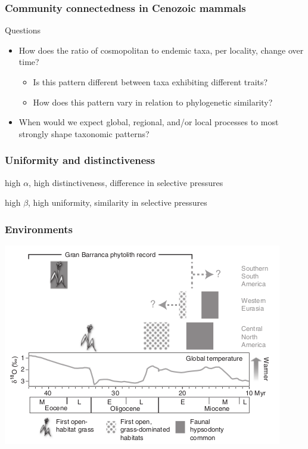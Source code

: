 \documentclass{beamer}
\begin{document}
\begin{frame}
  \frametitle{Community connectedness in Cenozoic mammals}

  \begin{block}{Questions}
    \begin{itemize}
      \item How does the ratio of cosmopolitan to endemic taxa, per locality, change over time? 
        \begin{itemize}
          \item Is this pattern different between taxa exhibiting different traits? 
          \item How does this pattern vary in relation to phylogenetic similarity? 
        \end{itemize}
      \item When would we expect global, regional, and/or local processes to most strongly shape taxonomic patterns?
    \end{itemize}
  \end{block}
\end{frame}

\begin{frame}
  \frametitle{Uniformity and distinctiveness}
  
  high \(\alpha\), high distinctiveness, difference in selective pressures
  
  \vspace{1cm}

  high \(\beta\), high uniformity, similarity in selective pressures

\end{frame}

\begin{frame}
  \frametitle{Environments}

  \includegraphics[height=0.8\textheight,width=\textwidth,keepaspectratio=true]{figure/stromberg}

  \tiny{}
\end{frame}
\end{document}
